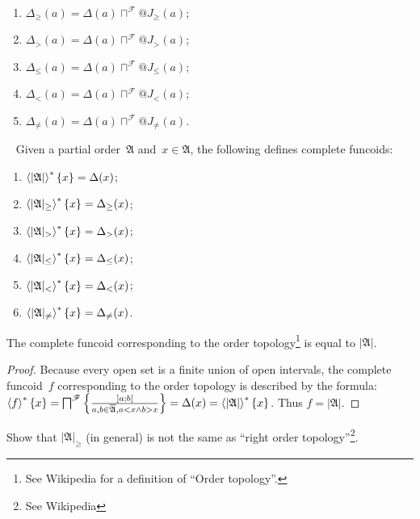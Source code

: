 \begin{obvious}
~
\begin{enumerate}
\item $\Delta_{\geq}(a) = \Delta(a)\sqcap^{\mathscr{F}} @J_{\geq}(a)$;
\item $\Delta_{>}(a) = \Delta(a)\sqcap^{\mathscr{F}} @J_{>}(a)$;
\item $\Delta_{\leq}(a) = \Delta(a)\sqcap^{\mathscr{F}} @J_{\leq}(a)$;
\item $\Delta_{<}(a) = \Delta(a)\sqcap^{\mathscr{F}} @J_{<}(a)$;
\item $\Delta_{\ne}(a) = \Delta(a)\sqcap^{\mathscr{F}} @J_{\ne}(a)$.
\end{enumerate}
\end{obvious}

\begin{defn}
~
Given a partial order~$\mathfrak{A}$ and~$x\in\mathfrak{A}$, the following defines complete funcoids:
\begin{enumerate}
\item $\left\langle |\mathfrak{A}|\right\rangle ^{\ast}\{x\} = \Delta(x)$;
\item $\left\langle |\mathfrak{A}|_{\geq}\right\rangle ^{\ast}\{x\} = \Delta_{\geq}(x)$;
\item $\left\langle |\mathfrak{A}|_{>}\right\rangle ^{\ast}\{x\} = \Delta_{>}(x)$;
\item $\left\langle |\mathfrak{A}|_{\leq}\right\rangle ^{\ast}\{x\} = \Delta_{\leq}(x)$;
\item $\left\langle |\mathfrak{A}|_{<}\right\rangle ^{\ast}\{x\} = \Delta_{<}(x)$;
\item $\left\langle |\mathfrak{A}|_{\ne}\right\rangle ^{\ast}\{x\} = \Delta_{\ne}(x)$.
\end{enumerate}
\end{defn}

\begin{prop}
The complete funcoid corresponding to the order topology\footnote{See Wikipedia for a definition of ``Order topology''.}
is equal to $|\mathfrak{A}|$.
\end{prop}

\begin{proof}
Because every open set is a finite union of open intervals, the complete funcoid~$f$ corresponding to the order topology
is described by the formula: $\left\langle f\right\rangle ^{\ast}\{x\} = \bigsqcap^{\mathscr{F}}\left\{ \frac{]a;b[}{a,b\in\overline{\mathfrak{A}}, a<x\land b>x}\right\} =
\Delta(x) = \left\langle |\mathfrak{A}|\right\rangle ^{\ast}\{x\}$. Thus $f=|\mathfrak{A}|$.
\end{proof}

\begin{xca}
Show that $|\mathfrak{A}|_{\geq}$ (in general) is not the same as ``right order topology''\footnote{See Wikipedia}.
\end{xca}

